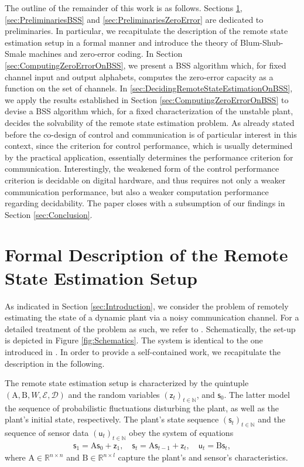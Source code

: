 \documentclass[conference]{IEEEtran}
\newcommand{\rs}{\mathsf{s}}
\newcommand{\rz}{\mathsf{z}}
\newcommand{\ru}{\mathsf{u}}
\def\E{{\mathcal E}}
\def\D{{\mathcal D}}
\def\NN{{\mathbb N}}
\def\RR{{\mathbb R}}
\def\mA{\bm{\mathrm{A}}}
\def\mB{\bm{\mathrm{B}}}
\newcommand{\tbr}[1]{}
\begin{document}
	The outline of the remainder of this work is as follows. Sections \ref{sec:FormalEstimationSetup}, \ref{sec:PreliminariesBSS} and \ref{sec:PreliminariesZeroError} are dedicated to preliminaries. 
	In particular, we recapitulate the description of the remote state estimation setup in a formal manner and introduce the theory of Blum-Shub-Smale machines and zero-error coding.
	In Section \ref{sec:ComputingZeroErrorOnBSS}, we present a BSS algorithm which, for fixed channel input and output alphabets, computes the zero-error capacity as a function on 
	the set of channels. In \ref{sec:DecidingRemoteStateEstimationOnBSS}, we apply the results established in Section \ref{sec:ComputingZeroErrorOnBSS} to devise a BSS algorithm
	which, for a fixed characterization of the unstable plant, decides the solvability of the remote state estimation problem. 
	As already stated before the co-design of control and communication is of particular interest in this context, since the criterion for control performance, which is
	usually determined by the practical application, essentially determines the performance criterion for communication. Interestingly, the weakened form of the control performance criterion 
	is decidable on digital hardware, and thus requires not only a weaker communication performance, but also a weaker computation performance regarding decidability. 
	The paper closes with a subsumption of 
	our findings in Section \ref{sec:Conclusion}.
                                                                        
\section{Formal Description of the Remote State Estimation Setup}	\label{sec:FormalEstimationSetup}
	\noindent As indicated in Section \ref{sec:Introduction}, we consider the problem of remotely estimating the state of a dynamic plant via a noisy communication channel. 
	For a detailed treatment of the problem as such, we refer to \cite{MS07}. Schematically, the set-up is depicted in Figure \ref{fig:Schematics}. 
	The system is identical to the one introduced in \cite{BoBoDe21TAC}\tbr{{\color{red}\(\leftarrow\) Change to TAC!~}}. In order to provide a self-contained work, we recapitulate 
	the description in the following.

	The remote state estimation setup is characterized by the quintuple \((\mA,\mB,W,\E,\D)\) and the random variables \((\rz_t)_{t\in\NN}\), and \(\rs_{0}\). 
	The latter model the sequence of probabilistic fluctuations disturbing the plant, as well as the plant's initial state, respectively. The plant's state sequence \((\rs_t)_{t\in\NN}\) 
	and the sequence of sensor data \((\ru_t)_{t\in\NN}\) obey the system of equations
	\begin{align*}	\rs_1    = \mA \rs_0 + \rz_1, \quad 
					\rs_t    = \mA \rs_{t-1} + \rz_t,\quad 
					\ru_t    = \mB \rs_t,
	\end{align*}
	where \(\mA\in\RR^{n\times n}\) and \(\mB\in\RR^{n\times l}\) capture the plant's and sensor's characteristics. 
\end{document}
